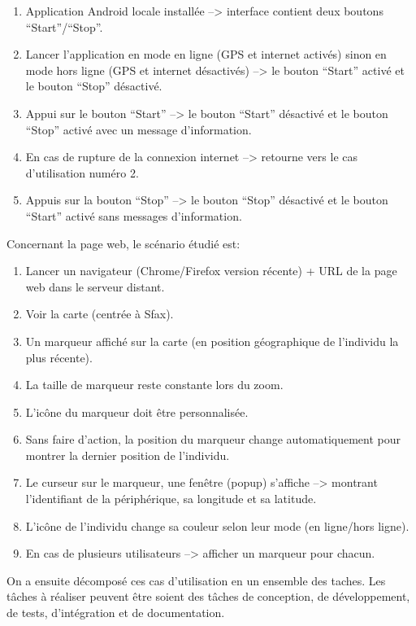 \begin{enumerate}
    \item Application Android locale installée --> interface contient deux
        boutons ``Start''/``Stop''.
    \item Lancer l'application en mode en ligne (\acrshort{GPS} et internet
        activés) sinon en mode hors ligne (\acrshort{GPS} et internet
        désactivés) --> le bouton ``Start'' activé et le bouton ``Stop''
        désactivé.
    \item Appui sur le bouton ``Start'' -->  le bouton ``Start'' désactivé et
        le bouton ``Stop'' activé avec un message d'information.
    \item En cas de rupture de la connexion internet --> retourne vers le cas
        d'utilisation numéro 2.
    \item Appuis sur la bouton ``Stop'' --> le bouton ``Stop'' désactivé et le
        bouton ``Start'' activé sans messages d'information.
\end{enumerate}

Concernant la page web, le scénario étudié est:

\begin{enumerate}
    \item Lancer un navigateur (Chrome/Firefox version récente) + URL de la
        page web dans le serveur distant.
    \item Voir la carte (centrée à Sfax).
    \item Un marqueur affiché sur la carte (en position géographique de
        l'individu la plus récente).
    \item La taille de marqueur reste constante lors du zoom.
    \item L'icône du marqueur doit être personnalisée.
    \item Sans faire d'action, la position du marqueur change automatiquement
        pour montrer la dernier position de l'individu.
    \item Le curseur sur le marqueur, une fenêtre (popup) s'affiche -->
        montrant l'identifiant de la périphérique, sa longitude et sa latitude.
    \item L'icône de l'individu change sa couleur selon leur mode (en
        ligne/hors ligne).
    \item En cas de plusieurs utilisateurs --> afficher un marqueur pour
        chacun.
\end{enumerate}

On a ensuite décomposé ces cas d'utilisation en un ensemble des taches. Les
tâches à réaliser peuvent être soient des tâches de conception, de
développement, de tests, d'intégration et de documentation.

